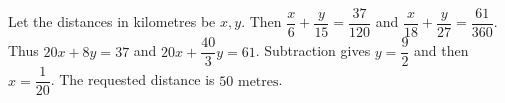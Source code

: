 Let the distances in kilometres be $x,y$. Then $\dfrac{x}{6}+\dfrac{y}{15}=\dfrac{37}{120}$ and $\dfrac{x}{18}+\dfrac{y}{27}=\dfrac{61}{360}$. Thus $20x+8y=37$ and $20x+\dfrac{40}{3}y=61$. Subtraction gives $y=\dfrac{9}{2}$ and then $x=\dfrac{1}{20}$. The requested distance is $\boxed{50\text{ metres}}$.
